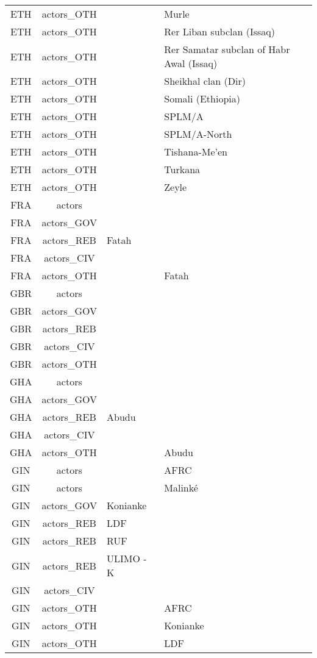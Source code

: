 \documentclass[12pt]{article}
\begin{document}
\begin{center}
\begin{longtable}{|c|c|p{7cm}|p{7cm}|}
  ETH & actors\_OTH &  & Murle \\ 
  ETH & actors\_OTH &  & Rer Liban subclan (Issaq) \\ 
  ETH & actors\_OTH &  & Rer Samatar subclan of Habr Awal (Issaq) \\ 
  ETH & actors\_OTH &  & Sheikhal clan (Dir) \\ 
  ETH & actors\_OTH &  & Somali (Ethiopia) \\ 
  ETH & actors\_OTH &  & SPLM/A \\ 
  ETH & actors\_OTH &  & SPLM/A-North \\ 
  ETH & actors\_OTH &  & Tishana-Me’en \\ 
  ETH & actors\_OTH &  & Turkana \\ 
  ETH & actors\_OTH &  & Zeyle \\ 
  FRA & actors &  &  \\ 
  FRA & actors\_GOV &  &  \\ 
  FRA & actors\_REB & Fatah &  \\ 
  FRA & actors\_CIV &  &  \\ 
  FRA & actors\_OTH &  & Fatah \\ 
  GBR & actors &  &  \\ 
  GBR & actors\_GOV &  &  \\ 
  GBR & actors\_REB &  &  \\ 
  GBR & actors\_CIV &  &  \\ 
  GBR & actors\_OTH &  &  \\ 
  GHA & actors &  &  \\ 
  GHA & actors\_GOV &  &  \\ 
  GHA & actors\_REB & Abudu &  \\ 
  GHA & actors\_CIV &  &  \\ 
  GHA & actors\_OTH &  & Abudu \\ 
  GIN & actors &  & AFRC \\ 
  GIN & actors &  & Malinké \\ 
  GIN & actors\_GOV & Konianke &  \\ 
  GIN & actors\_REB & LDF &  \\ 
  GIN & actors\_REB & RUF &  \\ 
  GIN & actors\_REB & ULIMO - K &  \\ 
  GIN & actors\_CIV &  &  \\ 
  GIN & actors\_OTH &  & AFRC \\ 
  GIN & actors\_OTH &  & Konianke \\ 
  GIN & actors\_OTH &  & LDF \\ 

\end{longtable}
\end{center}
\end{document}
